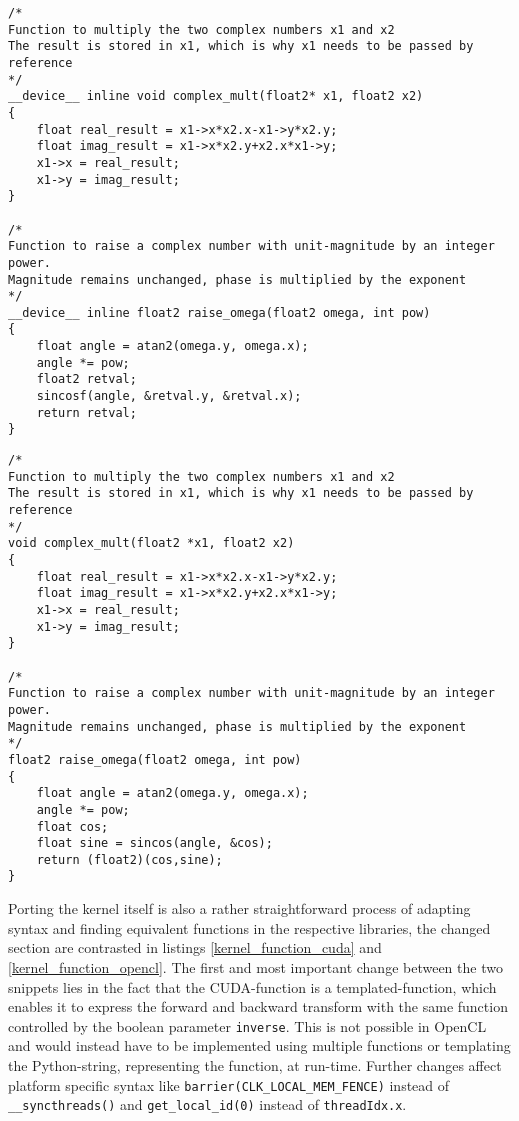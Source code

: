 \documentclass[english,11pt,a4paper,table]{article} %
\begin{document}
\begin{minipage}[t]{.48\textwidth}
	\begin{verbatim}
/*
Function to multiply the two complex numbers x1 and x2
The result is stored in x1, which is why x1 needs to be passed by reference
*/
__device__ inline void complex_mult(float2* x1, float2 x2)
{
    float real_result = x1->x*x2.x-x1->y*x2.y;
    float imag_result = x1->x*x2.y+x2.x*x1->y;
    x1->x = real_result;
    x1->y = imag_result;
}

/*
Function to raise a complex number with unit-magnitude by an integer power.
Magnitude remains unchanged, phase is multiplied by the exponent
*/
__device__ inline float2 raise_omega(float2 omega, int pow)
{
    float angle = atan2(omega.y, omega.x);
    angle *= pow;
    float2 retval;
    sincosf(angle, &retval.y, &retval.x);
    return retval;
}
\end{verbatim}
\end{minipage}\hfill%
\begin{minipage}[t]{.48\textwidth}
	\begin{verbatim}
/*
Function to multiply the two complex numbers x1 and x2
The result is stored in x1, which is why x1 needs to be passed by reference
*/
void complex_mult(float2 *x1, float2 x2)
{
    float real_result = x1->x*x2.x-x1->y*x2.y;
    float imag_result = x1->x*x2.y+x2.x*x1->y;
    x1->x = real_result;
    x1->y = imag_result;
}

/*
Function to raise a complex number with unit-magnitude by an integer power.
Magnitude remains unchanged, phase is multiplied by the exponent
*/
float2 raise_omega(float2 omega, int pow)
{
    float angle = atan2(omega.y, omega.x);
    angle *= pow;
    float cos;
    float sine = sincos(angle, &cos);
    return (float2)(cos,sine);
}
\end{verbatim}
\end{minipage}%

Porting the kernel itself is also a rather straightforward process of adapting syntax and finding equivalent functions in the respective libraries, the changed section are contrasted in listings \ref{kernel_function_cuda} and \ref{kernel_function_opencl}.
The first and most important change between the two snippets lies in the fact that the CUDA-function is a templated-function, which enables it to express the forward and backward transform with the same function controlled by the boolean parameter \texttt{inverse}.
This is not possible in OpenCL and would instead have to be implemented using multiple functions or templating the Python-string, representing the function, at run-time.
Further changes affect platform specific syntax like \texttt{barrier(CLK\_LOCAL\_MEM\_FENCE)} instead of \texttt{\_\_syncthreads()} and \texttt{get\_local\_id(0)} instead of \texttt{threadIdx.x}.
\end{document}
